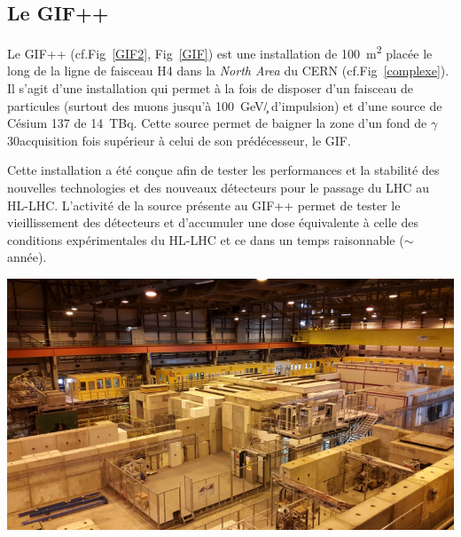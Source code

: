 \subsection{Le GIF++}
Le GIF++ \cite{Jakel:1977147} (cf.Fig~\ref{GIF2}, Fig~\ref{GIF}) est une installation de \SI{100}{\square\meter} placée le long de la ligne de faisceau H4 dans la \textit{North Area} du CERN (cf.Fig~\ref{complexe}). Il s'agit d'une installation qui permet à la fois de disposer d'un faisceau de particules (surtout des muons jusqu'à \SI{100}{\giga\eV/\c} d'impulsion) et d'une source de Césium \num{137} de \SI{14}{\tera\becquerel}. Cette source permet de baigner la zone d'un fond de $\gamma$ \num{30}acquisition fois supérieur à celui de son prédécesseur, le GIF.

Cette installation a été conçue afin de tester les performances et la stabilité des nouvelles technologies et des nouveaux détecteurs pour le passage du LHC au HL-LHC. L'activité de la source présente au GIF++ permet de tester le vieillissement des détecteurs et d'accumuler une dose équivalente à celle des conditions expérimentales du HL-LHC et ce dans un temps raisonnable ($\sim$ année). 

\marginpar
{
	\centering
	\includegraphics[width=\marginparwidth]{GLA/GIF2.png}
	\label{GIF2}
}

